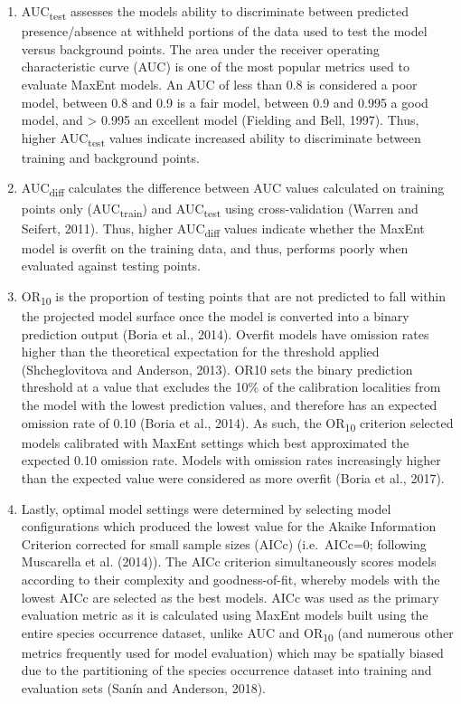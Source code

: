 \documentclass[12pt,]{article}
\begin{document}
\begin{enumerate}
\def\labelenumi{(\arabic{enumi})}
\item
  AUC\textsubscript{test} assesses the models ability to discriminate
  between predicted presence/absence at withheld portions of the data
  used to test the model versus background points. The area under the
  receiver operating characteristic curve (AUC) is one of the most
  popular metrics used to evaluate MaxEnt models. An AUC of less than
  0.8 is considered a poor model, between 0.8 and 0.9 is a fair model,
  between 0.9 and 0.995 a good model, and \textgreater{} 0.995 an
  excellent model (Fielding and Bell, 1997). Thus, higher
  AUC\textsubscript{test} values indicate increased ability to
  discriminate between training and background points.
\item
  AUC\textsubscript{diff} calculates the difference between AUC values
  calculated on training points only (AUC\textsubscript{train}) and
  AUC\textsubscript{test} using cross-validation (Warren and Seifert,
  2011). Thus, higher AUC\textsubscript{diff} values indicate whether
  the MaxEnt model is overfit on the training data, and thus, performs
  poorly when evaluated against testing points.
\item
  OR\textsubscript{10} is the proportion of testing points that are not
  predicted to fall within the projected model surface once the model is
  converted into a binary prediction output (Boria et al., 2014).
  Overfit models have omission rates higher than the theoretical
  expectation for the threshold applied (Shcheglovitova and Anderson,
  2013). OR10 sets the binary prediction threshold at a value that
  excludes the 10\% of the calibration localities from the model with
  the lowest prediction values, and therefore has an expected omission
  rate of 0.10 (Boria et al., 2014). As such, the OR\textsubscript{10}
  criterion selected models calibrated with MaxEnt settings which best
  approximated the expected 0.10 omission rate. Models with omission
  rates increasingly higher than the expected value were considered as
  more overfit (Boria et al., 2017).
\item
  Lastly, optimal model settings were determined by selecting model
  configurations which produced the lowest value for the Akaike
  Information Criterion corrected for small sample sizes (AICc)
  (i.e.~AICc=0; following Muscarella et al. (2014)). The AICc criterion
  simultaneously scores models according to their complexity and
  goodness-of-fit, whereby models with the lowest AICc are selected as
  the best models. AICc was used as the primary evaluation metric as it
  is calculated using MaxEnt models built using the entire species
  occurrence dataset, unlike AUC and OR\textsubscript{10} (and numerous
  other metrics frequently used for model evaluation) which may be
  spatially biased due to the partitioning of the species occurrence
  dataset into training and evaluation sets (Sanín and Anderson, 2018).
\end{enumerate}
\end{document}
